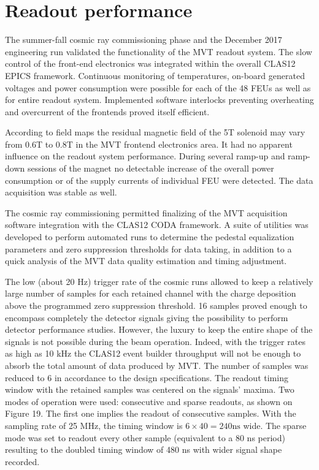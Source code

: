 \section{Readout performance}

The summer-fall cosmic ray commissioning phase and the December 2017 engineering run validated the functionality of the MVT readout system. The slow control of the front-end electronics was integrated within the overall CLAS12 EPICS framework. Continuous monitoring of temperatures, on-board generated voltages and power consumption were possible for each of the 48 FEUs as well as for entire readout system. Implemented software interlocks preventing overheating and overcurrent of the frontends proved itself efficient.

According to field maps the residual magnetic field of the 5T solenoid may vary from 0.6T to 0.8T in the MVT frontend electronics area. It had no apparent influence on the readout system performance. During several ramp-up and ramp-down sessions of the magnet no detectable increase of the overall power consumption or of the supply currents of individual FEU were detected. The data acquisition was stable as well.

The cosmic ray commissioning permitted finalizing of the MVT acquisition software integration with the CLAS12 CODA framework. A suite of utilities was developed to perform automated runs to determine the pedestal equalization parameters and zero suppression thresholds for data taking, in addition to a quick analysis of the MVT data quality estimation and timing adjustment.

The low (about 20 Hz) trigger rate of the cosmic runs allowed to keep a relatively large number of samples for each retained channel with the charge deposition above the programmed zero suppression threshold. 16 samples proved enough to encompass completely the detector signals giving the possibility to perform detector performance studies. However, the luxury to keep the entire shape of the signals is not possible during the beam operation. Indeed, with the trigger rates as high as 10 kHz the CLAS12 event builder throughput will not be enough to absorb the total amount of data produced by MVT. The number of samples was reduced to 6 in accordance to the design specifications. The readout timing window with the retained samples was centered on the signals' maxima. Two modes of operation were used: consecutive and sparse readouts, as shown on Figure 19. The first one implies the readout of consecutive samples. With the sampling rate of 25 MHz, the timing window is $6 \times 40 = 240 \text{ns}$ wide. The sparse mode was set to readout every other sample (equivalent to a 80 ns period) resulting to the doubled timing window of 480 ns with wider signal shape recorded.


